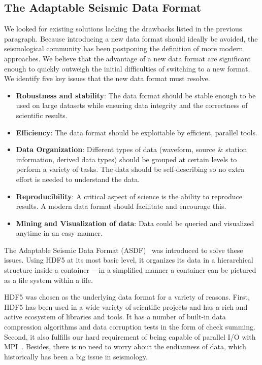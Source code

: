 \subsection{The Adaptable Seismic Data Format}

We looked for existing solutions lacking the drawbacks listed in the previous
paragraph.
Because introducing a new data format should ideally be avoided,
the seismological community has been postponing the
definition of more modern approaches.
We believe that the advantage of a new data format are significant
enough to quickly outweigh the initial difficulties of switching to a new
format. We identify five key issues that the new data format must resolve.
\begin{itemize}
  \item \textbf{Robustness and stability}: The data format should be stable enough
  to be used on large datasets while ensuring data integrity and the correctness of scientific results.
  \item \textbf{Efficiency}: The data format should be exploitable by efficient, parallel tools.
  \item \textbf{Data Organization}: Different types of data (waveform, source \& station information,
    derived data types) should be grouped at certain levels to perform a variety of tasks. The data
   should be self-describing so no extra effort is needed to understand the data.
  \item \textbf{Reproducibility}: A critical aspect of science is the ability to reproduce
    results. A modern data format should facilitate and encourage this.
  \item \textbf{Mining and Visualization of data}: Data could be queried and visualized anytime
    in an easy manner.
\end{itemize}

The Adaptable Seismic Data  Format (ASDF)~\cite{krischer2016adaptable} was introduced to
solve these issues.
Using HDF5 at its most basic level, it organizes its data in a hierarchical
structure inside a container ---in a simplified manner a container can be
pictured as a file system within a file.

HDF5 was chosen as the underlying data format for a variety of reasons.
First, HDF5 has been used in a wide variety of scientific projects and
has a rich and active ecosystem of libraries and tools. It has a number of
built-in data compression algorithms and data corruption tests in the form of
check summing.
Second, it also fulfills our hard requirement of being capable of parallel I/O
with MPI~\cite{MPI, Howison2010}.
Besides, there is no need to worry about the endianness of data, which
historically has been a big issue in seismology.

